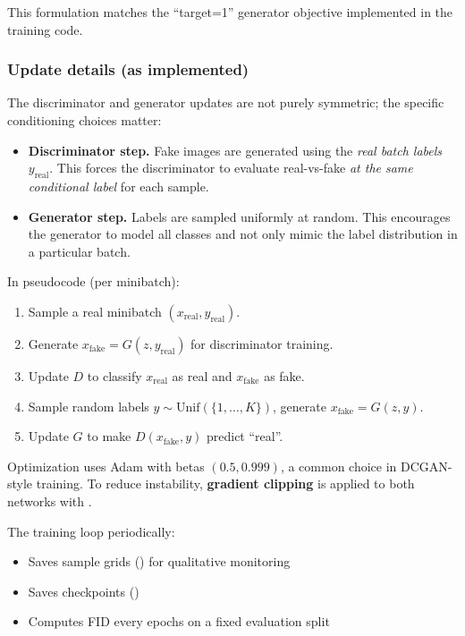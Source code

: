 This formulation matches the ``target=1'' generator objective implemented in the training code.

\subsubsection{Update details (as implemented)}

The discriminator and generator updates are not purely symmetric; the specific conditioning choices matter:
\begin{itemize}
\item \textbf{Discriminator step.} Fake images are generated using the \emph{real batch labels} \(y_{\text{real}}\). This forces the discriminator to evaluate real-vs-fake \emph{at the same conditional label} for each sample.
\item \textbf{Generator step.} Labels are sampled uniformly at random. This encourages the generator to model all classes and not only mimic the label distribution in a particular batch.
\end{itemize}

In pseudocode (per minibatch):
\begin{enumerate}
\item Sample a real minibatch \((x_{\text{real}}, y_{\text{real}})\).
\item Generate \(x_{\text{fake}} = G(z, y_{\text{real}})\) for discriminator training.
\item Update \(D\) to classify \(x_{\text{real}}\) as real and \(x_{\text{fake}}\) as fake.
\item Sample random labels \(y \sim \mathrm{Unif}(\{1,\dots,K\})\), generate \(x_{\text{fake}} = G(z, y)\).
\item Update \(G\) to make \(D(x_{\text{fake}}, y)\) predict ``real''.
\end{enumerate}

Optimization uses Adam with betas \((0.5, 0.999)\), a common choice in DCGAN-style training. To reduce instability, \textbf{gradient clipping} is applied to both networks with .

The training loop periodically:
\begin{itemize}
\item Saves sample grids () for qualitative monitoring
\item Saves checkpoints ()
\item Computes FID every  epochs on a fixed evaluation split
\end{itemize}

